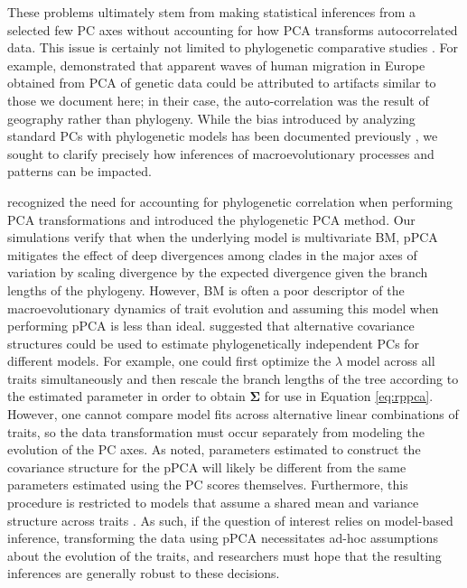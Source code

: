 \documentclass[a4paper,11pt]{article}
\begin{document}
These problems ultimately stem from making statistical inferences from a selected few PC axes without accounting for how PCA transforms autocorrelated data. This issue is certainly not limited to phylogenetic comparative studies \citep[see][]{Richman1986, Podani2002, Jolliffe2002, Novembre,  Bookstein2012}. For example, \citet{Novembre} demonstrated that apparent waves of human migration in Europe obtained from PCA of genetic data \citep[e.g.,][]{Cavalli} could be attributed to artifacts similar to those we document here; in their case, the auto-correlation was the result of geography rather than phylogeny. While the bias introduced by analyzing standard PCs with phylogenetic models has been documented previously \citep{Revell2008, Polly2013}, we sought to clarify precisely how inferences of macroevolutionary processes and patterns can be impacted.  

\citet{Revell2008} recognized the need for accounting for phylogenetic correlation when performing PCA transformations and introduced the phylogenetic PCA method. Our simulations verify that when the underlying model is multivariate BM, pPCA mitigates the effect of deep divergences among clades in the major axes of variation by scaling divergence by the expected divergence given the branch lengths of the phylogeny. However, BM is often a poor descriptor of the macroevolutionary dynamics of trait evolution \citep[for example, see][]{Harmon2010, Pennell-adequacy} and assuming this model when performing pPCA is less than ideal. \citet{Revell2008} suggested that alternative covariance structures could be used to estimate phylogenetically independent PCs for different models. For example, one could first optimize the $\lambda$ model \citep{Freckleton2002} across all traits simultaneously and then rescale the branch lengths of the tree according to the estimated parameter in order to obtain $\mathbf{\Sigma}$ for use in Equation \ref{eq:rppca}. However, one cannot compare model fits across alternative linear combinations of traits, so the data transformation must occur separately from modeling the evolution of the PC axes. As \citet{Revell2008} noted, parameters estimated to construct the covariance structure for the pPCA will likely be different from the same parameters estimated using the PC scores themselves. Furthermore, this procedure is restricted to models that assume a shared mean and variance structure across traits \citep[see][for examples where this does not apply]{Hansen2008, Hansen2012SysBio, Bartoszek2012}. As such, if the question of interest relies on model-based inference, transforming the data using pPCA necessitates ad-hoc assumptions about the evolution of the traits, and researchers must hope that the resulting inferences are generally robust to these decisions.
\end{document}
